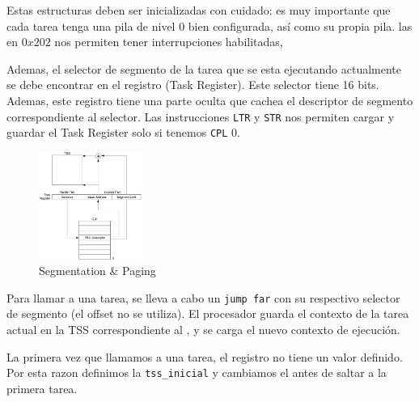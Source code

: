 Estas estructuras deben ser inicializadas con cuidado: es muy importante que cada tarea tenga una pila de nivel 0 bien configurada, así como su propia pila. las  en $0x202$ nos permiten tener interrupciones habilitadas,

Ademas, el selector de segmento de la tarea que se
esta ejecutando actualmente se debe encontrar en el registro  (Task Register). Este selector tiene 16 bits. Ademas, este registro tiene una parte oculta que cachea el descriptor de segmento correspondiente al selector. Las instrucciones \texttt{LTR} y \texttt{STR} nos permiten cargar y guardar el Task Register solo si tenemos \texttt{CPL} 0.

\begin{figure}[H]
  \centering
    \includegraphics[width=0.3\textwidth]{images/task_register}
  \caption{Segmentation \& Paging}
\end{figure}

Para llamar a una tarea, se lleva a cabo un \texttt{jump far} con su respectivo selector de segmento (el offset no se utiliza). El procesador guarda el contexto de la tarea actual en la TSS correspondiente al , y se carga el nuevo contexto de ejecución. 

La primera vez que llamamos a una tarea, el registro  no tiene un valor definido. Por esta razon definimos la \texttt{tss\_inicial} y cambiamos el  antes de saltar a la primera tarea.
